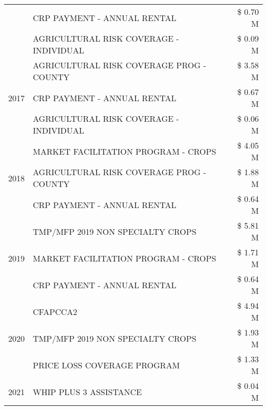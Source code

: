 \begin{tabular}{llr}
 & CRP PAYMENT - ANNUAL RENTAL & \$ 0.70 M \\
 & AGRICULTURAL RISK COVERAGE - INDIVIDUAL & \$ 0.09 M \\
\cline{1-3}
\multirow[t]{3}{*}{2017} & AGRICULTURAL RISK COVERAGE PROG - COUNTY & \$ 3.58 M \\
 & CRP PAYMENT - ANNUAL RENTAL & \$ 0.67 M \\
 & AGRICULTURAL RISK COVERAGE - INDIVIDUAL & \$ 0.06 M \\
\cline{1-3}
\multirow[t]{3}{*}{2018} & MARKET FACILITATION PROGRAM - CROPS & \$ 4.05 M \\
 & AGRICULTURAL RISK COVERAGE PROG - COUNTY & \$ 1.88 M \\
 & CRP PAYMENT - ANNUAL RENTAL & \$ 0.64 M \\
\cline{1-3}
\multirow[t]{3}{*}{2019} & TMP/MFP 2019 NON SPECIALTY CROPS & \$ 5.81 M \\
 & MARKET FACILITATION PROGRAM - CROPS & \$ 1.71 M \\
 & CRP PAYMENT - ANNUAL RENTAL & \$ 0.64 M \\
\cline{1-3}
\multirow[t]{3}{*}{2020} & CFAPCCA2 & \$ 4.94 M \\
 & TMP/MFP 2019 NON SPECIALTY CROPS & \$ 1.93 M \\
 & PRICE LOSS COVERAGE PROGRAM & \$ 1.33 M \\
\cline{1-3}
2021 & WHIP PLUS 3 ASSISTANCE & \$ 0.04 M \\
\cline{1-3}
\bottomrule
\end{tabular}
